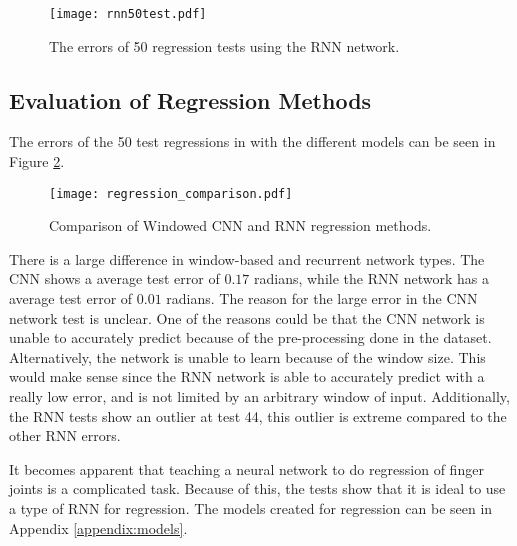 \documentclass[../main.tex]{subfiles}
\begin{document}
\begin{figure}[H]
\begin{center}
\texttt{[image: rnn50test.pdf]}
\caption{The errors of 50 regression tests using the RNN network.}
\label{fig:rnntest}
\end{center}
\end{figure}

\subsection{Evaluation of Regression Methods}

The errors of the 50 test regressions in with the different models can be seen in Figure \ref{fig:regression_comp}.

\begin{figure}[h]
\begin{center}
\texttt{[image: regression\_comparison.pdf]}
\caption{Comparison of Windowed CNN and RNN regression methods.}
\label{fig:regression_comp}
\end{center}
\end{figure}

There is a large difference in window-based and recurrent network types.
The \gls{CNN} shows a average test error of $0.17$ radians, while the \gls{RNN} network has a average test error of $0.01$ radians. 
The reason for the large error in the \gls{CNN} network test is unclear.
One of the reasons could be that the \gls{CNN} network is unable to accurately predict because of the pre-processing done in the dataset.
Alternatively, the network is unable to learn because of the window size.
This would make sense since the \gls{RNN} network is able to accurately predict with a really low error, and is not limited by an arbitrary window of input.
Additionally, the \gls{RNN} tests show an outlier at test 44, this outlier is extreme compared to the other \gls{RNN} errors.

It becomes apparent that teaching a neural network to do regression of finger joints is a complicated task.
Because of this, the tests show that it is ideal to use a type of \gls{RNN} for regression.
The models created for regression can be seen in Appendix \ref{appendix:models}.

\end{document}
